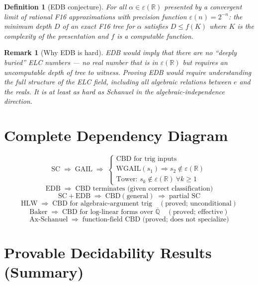 \documentclass[11pt]{article}
\newtheorem{definition}[theorem]{Definition}
\newtheorem{remark}[theorem]{Remark}
\begin{document}
\begin{definition}[EDB conjecture]
For all $\alpha \in \varepsilon(\mathbb{R})$ presented by a convergent limit
of rational F16 approximations with precision function $\varepsilon(n) = 2^{-n}$:
the minimum depth $D$ of an exact F16 tree for $\alpha$ satisfies
$D \leq f(K)$ where $K$ is the complexity of the presentation
and $f$ is a computable function.
\end{definition}

\begin{remark}[Why EDB is hard]
EDB would imply that there are no ``deeply buried'' ELC numbers —
no real number that is in $\varepsilon(\mathbb{R})$ but requires an
uncomputable depth of tree to witness.
Proving EDB would require understanding the full structure of the ELC field,
including all algebraic relations between $e$ and the reals.
It is at least as hard as Schanuel in the algebraic-independence direction.
\end{remark}

\section{Complete Dependency Diagram}

\[
\boxed{\mathrm{SC}}
\;\Longrightarrow\;
\boxed{\mathrm{GAIL}}
\;\Longrightarrow\;
\begin{cases}
\text{CBD for trig inputs} \\
\text{WGAIL}(s_1) \Rightarrow s_2 \notin \varepsilon(\mathbb{R}) \\
\text{Tower: } s_k \notin \varepsilon(\mathbb{R})\ \forall k \geq 1
\end{cases}
\]
\[
\boxed{\mathrm{EDB}}
\;\Longrightarrow\;
\text{CBD terminates (given correct classification)}
\]
\[
\boxed{\mathrm{SC} + \mathrm{EDB}}
\;\Longrightarrow\;
\boxed{\mathrm{CBD (general)}}
\;\Longrightarrow\;
\text{partial SC}
\]
\[
\boxed{\mathrm{HLW}}
\;\Longrightarrow\;
\text{CBD for algebraic-argument trig}
\quad (\text{proved; unconditional})
\]
\[
\boxed{\mathrm{Baker}}
\;\Longrightarrow\;
\text{CBD for log-linear forms over } \overline{\mathbb{Q}}
\quad (\text{proved; effective})
\]
\[
\boxed{\mathrm{Ax\text{-}Schanuel}}
\;\Longrightarrow\;
\text{function-field CBD (proved; does not specialize)}
\]

\section{Provable Decidability Results (Summary)}
\end{document}
